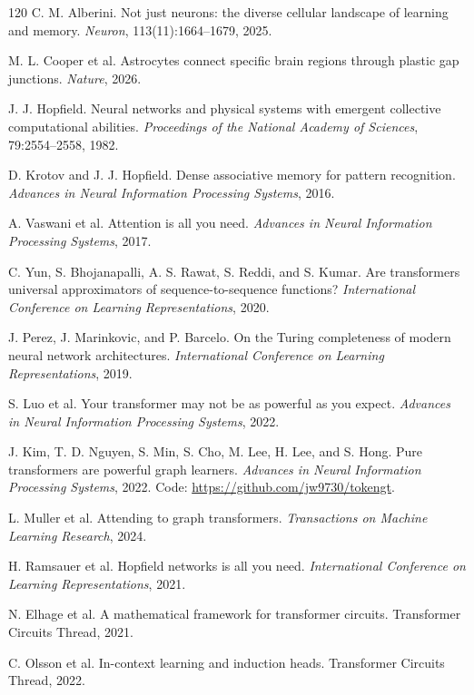 \documentclass[11pt]{article}
\newcommand{\1}{\mathbf{1}}
\begin{document}
\begin{thebibliography}{120}
C. M. Alberini. Not just neurons: the diverse cellular landscape of learning and memory. \emph{Neuron}, 113(11):1664--1679, 2025.

M. L. Cooper et al. Astrocytes connect specific brain regions through plastic gap junctions. \emph{Nature}, 2026.

J. J. Hopfield. Neural networks and physical systems with emergent collective computational abilities. \emph{Proceedings of the National Academy of Sciences}, 79:2554--2558, 1982.

D. Krotov and J. J. Hopfield. Dense associative memory for pattern recognition. \emph{Advances in Neural Information Processing Systems}, 2016.

A. Vaswani et al. Attention is all you need. \emph{Advances in Neural Information Processing Systems}, 2017.

C. Yun, S. Bhojanapalli, A. S. Rawat, S. Reddi, and S. Kumar. Are transformers universal approximators of sequence-to-sequence functions? \emph{International Conference on Learning Representations}, 2020.

J. Perez, J. Marinkovic, and P. Barcelo. On the Turing completeness of modern neural network architectures. \emph{International Conference on Learning Representations}, 2019.

S. Luo et al. Your transformer may not be as powerful as you expect. \emph{Advances in Neural Information Processing Systems}, 2022.

J. Kim, T. D. Nguyen, S. Min, S. Cho, M. Lee, H. Lee, and S. Hong. Pure transformers are powerful graph learners. \emph{Advances in Neural Information Processing Systems}, 2022. Code: \url{https://github.com/jw9730/tokengt}.

L. Muller et al. Attending to graph transformers. \emph{Transactions on Machine Learning Research}, 2024.

H. Ramsauer et al. Hopfield networks is all you need. \emph{International Conference on Learning Representations}, 2021.

N. Elhage et al. A mathematical framework for transformer circuits. Transformer Circuits Thread, 2021.

C. Olsson et al. In-context learning and induction heads. Transformer Circuits Thread, 2022.


\end{thebibliography}
\end{document}
